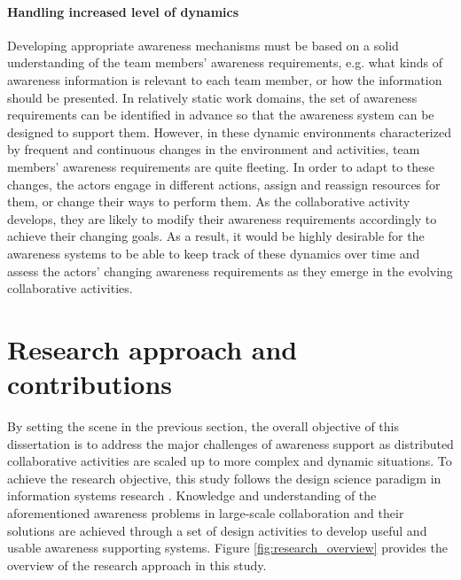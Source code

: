 \paragraph*{Handling increased level of dynamics} %
\label{par:handling_increased_level_of_dynamics}
Developing appropriate awareness mechanisms must be based on a solid understanding of the team members' awareness requirements, e.g. what kinds of awareness information is relevant to each team member, or how the information should be presented. In relatively static work domains, the set of awareness requirements can be identified in advance so that the awareness system can be designed to support them. However, in these dynamic environments characterized by frequent and continuous changes in the environment and activities, team members' awareness requirements are quite fleeting. In order to adapt to these changes, the actors engage in different actions, assign and reassign resources for them, or change their ways to perform them. As the collaborative activity develops, they are likely to modify their awareness requirements accordingly to achieve their changing goals. As a result, it would be highly desirable for the awareness systems to be able to keep track of these dynamics over time and assess the actors' changing awareness requirements as they emerge in the evolving collaborative activities.

\section{Research approach and contributions} %
\label{sec:research_approach_and_contributions}
By setting the scene in the previous section, the overall objective of this dissertation is to address the major challenges of awareness support as distributed collaborative activities are scaled up to more complex and dynamic situations. To achieve the research objective, this study follows the design science paradigm in information systems research \cite{Hevner2004}. Knowledge and understanding of the aforementioned awareness problems in large-scale collaboration and their solutions are achieved through a set of design activities to develop useful and usable awareness supporting systems. Figure \ref{fig:research_overview} provides the overview of the research approach in this study.

